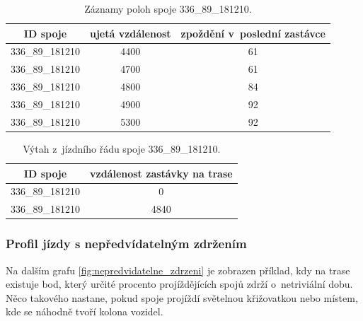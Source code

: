 \begin{center}
   \begin{table}[ht]
\centering
\begin{tabular}{|c|c|c|}
\hline
ID spoje & ujetá vzdálenost & zpoždění v~poslední zastávce \\ \hline \hline
336\_89\_181210 & 4400 & 61 \\ \hline
336\_89\_181210 & 4700 & 61 \\ \hline
336\_89\_181210 & 4800 & 84 \\ \hline
336\_89\_181210 & 4900 & 92 \\ \hline
336\_89\_181210 & 5300 & 92 \\ \hline
\end{tabular}
\label{table:9270_samples}
\caption{Záznamy poloh spoje 336\_89\_181210.}
\end{table}
\end{center}


\begin{center}
   \begin{table}[ht]
\centering
\begin{tabular}{|c|c|}
\hline
ID spoje & vzdálenost zastávky na trase \\ \hline \hline
336\_89\_181210 & 0 \\ \hline
336\_89\_181210 & 4840 \\ \hline
\end{tabular}
\label{table:9270_ride}
\caption{Výtah z~jízdního řádu spoje 336\_89\_181210.}
\end{table}
\end{center}


\subsubsection{Profil jízdy s nepředvídatelným zdržením} \label{subsubsection:nepr_zpozd}


Na dalším grafu \ref{fig:nepredvidatelne_zdrzeni} je zobrazen příklad, kdy na trase existuje bod, který určité procento projíždějících spojů zdrží o~netriviální dobu. Něco takového nastane, pokud spoje projíždí světelnou křižovatkou nebo místem, kde se náhodně tvoří kolona vozidel.


